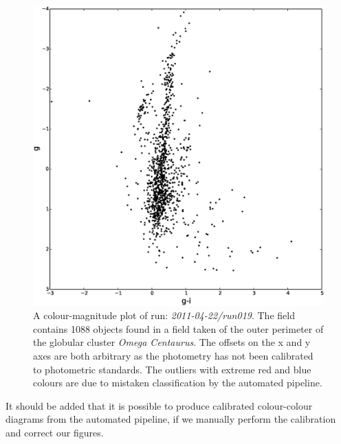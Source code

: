\begin{figure}
\centering
\includegraphics[width=120mm]{images//2011-04-22-run019-omegacen-colourmagnitude.eps}
\caption{A colour-magnitude plot of run: \emph{2011-04-22/run019}. The field contains 1088 objects found in a field taken of the outer perimeter of the globular cluster \emph{Omega Centaurus}. The offsets on the x and y axes are both arbitrary as the photometry has not been calibrated to photometric standards. The outliers with extreme red and blue colours are due to mistaken classification by the automated pipeline.}
\label{fig:OmegaCen-colourmagnitude}
\end{figure}

It should be added that it is possible to produce calibrated colour-colour diagrams from the automated pipeline, if we manually perform the calibration and correct our figures. 
